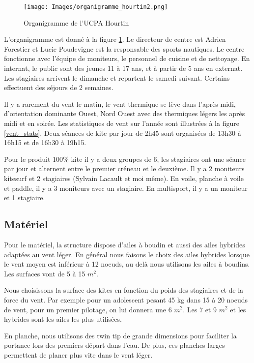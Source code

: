 \documentclass[11pt,a4paper]{report}
\begin{document}
\begin{figure}[h]
\centering
\texttt{[image: Images/organigramme\_hourtin2.png]} 
\caption{Organigramme de l'UCPA Hourtin\label{organi_hourtin}}
\end{figure}

L'organigramme est donné à la figure \ref{organi_hourtin}.
Le directeur de centre est Adrien Forestier et 
Lucie Poudevigne est la responsable des sports nautiques.
Le centre fonctionne avec l'équipe de moniteurs, le personnel 
de cuisine et de nettoyage. En internat, le public sont des jeunes
11 à 17 ans, et  à partir de 5 ans  en externat.
Les stagiaires arrivent le dimanche et repartent
le samedi suivant. Certains effectuent des séjours de 2 semaines.

Il y a rarement du vent le matin, le vent thermique se lève dans
l'après midi, d'orientation dominante Ouest, Nord Ouest avec des
thermiques légers les après midi et  en soirée. Les statistiques
de vent sur l'année sont illustrées à la figure \ref{vent_stats}.
Deux séances de kite par jour de 2h45 sont organisées de
13h30 à 16h15 et de 16h30 à 19h15. 

Pour le produit 100\% kite il y a deux groupes de 6, les stagiaires ont
une séance par jour et alternent entre le premier créneau et le deuxième.
Il y a 2 moniteurs kitesurf et 2 stagiaires (Sylvain Lacault et moi m\^eme).
En voile, planche à voile et paddle, il y a 3 moniteurs avec un stagiaire.
En multisport, il y a un moniteur et 1 stagiaire.

\subsection{Matériel}
Pour le matériel, la structure dispose d'ailes à boudin et aussi 
des ailes hybrides adaptées au vent léger. En général nous faisons
le choix des ailes hybrides lorsque le vent moyen est inférieur à
12 noeuds, au delà nous utilisons les ailes à boudins. Les
surfaces vont de 5 à 15 $m^2$. 

Nous choisissons la surface des kites
en fonction du poids des stagiaires et de la force du vent.
Par exemple pour un adolescent pesant 45 kg dans 15 à 20 noeuds
de vent, pour un premier pilotage, on lui donnera une 6 $m^2$.
Les 7 et 9 $m^2$ et les hybrides sont les ailes les plus utilisées.

En planche, nous utilisons des twin tip de grande dimensions 
pour faciliter la portance lors des premiers départ dans l'eau.
De plus, ces planches larges permettent de planer plus vite
dans le vent léger.
\end{document}
